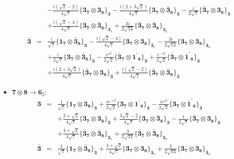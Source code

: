 \documentclass[english]{article}
\newcommand{\subcg}[3]{\big\{ {#1}\otimes{#2}\big\}^{}_{#3}}
\newcommand{\rep}[1]{\mathbf{#1}}
\begin{document}
\begin{itemize}
\begin{eqnarray*}
 & & -\frac{i \left(\sqrt{2}-2\right)}{4 \sqrt{7}}\subcg{\rep{3}_{\rep{7}}}{\rep{3}_{\rep{8}}}{\rep{3}}-\frac{i \left(2+3 \sqrt{2}\right)}{4 \sqrt{7}}\subcg{\rep{3}_{\rep{7}}}{\rep{\bar{3}}_{\rep{8}}}{\rep{3}}-\frac{i}{2 \sqrt{7}}\subcg{\rep{\bar{3}}_{\rep{7}}}{\rep{3}_{\rep{8}}}{\rep{3}} \\ 
 & & +\frac{i \left(\sqrt{2}-4\right)}{4 \sqrt{7}}\subcg{\rep{\bar{3}}_{\rep{7}}}{\rep{\bar{3}}_{\rep{8}}}{\rep{3}_{s}}+\frac{3 i}{2 \sqrt{14}}\subcg{\rep{\bar{3}}_{\rep{7}}}{\rep{\bar{3}}_{\rep{8}}}{\rep{3}_{a}}
\\
\rep{\bar{3}} &=& \frac{i}{\sqrt{7}}\subcg{\rep{1}_{\rep{7}}}{\rep{\bar{3}}_{\rep{8}}}{\rep{\bar{3}}}-\frac{i \left(\sqrt{2}-4\right)}{4 \sqrt{7}}\subcg{\rep{3}_{\rep{7}}}{\rep{3}_{\rep{8}}}{\rep{\bar{3}}_{s}}-\frac{3 i}{2 \sqrt{14}}\subcg{\rep{3}_{\rep{7}}}{\rep{3}_{\rep{8}}}{\rep{\bar{3}}_{a}} \\ 
 & & +\frac{i}{2 \sqrt{7}}\subcg{\rep{3}_{\rep{7}}}{\rep{\bar{3}}_{\rep{8}}}{\rep{\bar{3}}}-\frac{e^{i \beta }}{2 \sqrt{2}}\subcg{\rep{\bar{3}}_{\rep{7}}}{\rep{1^{\prime}}_{\rep{8}}}{\rep{\bar{3}}}+\frac{e^{-i \beta }}{2 \sqrt{2}}\subcg{\rep{\bar{3}}_{\rep{7}}}{\rep{\bar{1}^{\prime}}_{\rep{8}}}{\rep{\bar{3}}} \\ 
 & & +\frac{i \left(2+3 \sqrt{2}\right)}{4 \sqrt{7}}\subcg{\rep{\bar{3}}_{\rep{7}}}{\rep{3}_{\rep{8}}}{\rep{\bar{3}}}+\frac{i \left(\sqrt{2}-2\right)}{4 \sqrt{7}}\subcg{\rep{\bar{3}}_{\rep{7}}}{\rep{\bar{3}}_{\rep{8}}}{\rep{\bar{3}}}
\end{eqnarray*}
\item $\rep{7}\otimes\rep{8}\to\rep{6}_{2}$:
\begin{eqnarray*}
\rep{3} &=& \frac{1}{\sqrt{7}}\subcg{\rep{1}_{\rep{7}}}{\rep{3}_{\rep{8}}}{\rep{3}}+\frac{i e^{-i \beta }}{2 \sqrt{2}}\subcg{\rep{3}_{\rep{7}}}{\rep{1^{\prime}}_{\rep{8}}}{\rep{3}}-\frac{i e^{i \beta }}{2 \sqrt{2}}\subcg{\rep{3}_{\rep{7}}}{\rep{\bar{1}^{\prime}}_{\rep{8}}}{\rep{3}} \\ 
 & & +\frac{2+\sqrt{2}}{4 \sqrt{7}}\subcg{\rep{3}_{\rep{7}}}{\rep{3}_{\rep{8}}}{\rep{3}}+\frac{3 \sqrt{2}-2}{4 \sqrt{7}}\subcg{\rep{3}_{\rep{7}}}{\rep{\bar{3}}_{\rep{8}}}{\rep{3}}-\frac{1}{2 \sqrt{7}}\subcg{\rep{\bar{3}}_{\rep{7}}}{\rep{3}_{\rep{8}}}{\rep{3}} \\ 
 & & +\frac{4+\sqrt{2}}{4 \sqrt{7}}\subcg{\rep{\bar{3}}_{\rep{7}}}{\rep{\bar{3}}_{\rep{8}}}{\rep{3}_{s}}+\frac{3}{2 \sqrt{14}}\subcg{\rep{\bar{3}}_{\rep{7}}}{\rep{\bar{3}}_{\rep{8}}}{\rep{3}_{a}}
\\
\rep{\bar{3}} &=& \frac{1}{\sqrt{7}}\subcg{\rep{1}_{\rep{7}}}{\rep{\bar{3}}_{\rep{8}}}{\rep{\bar{3}}}+\frac{4+\sqrt{2}}{4 \sqrt{7}}\subcg{\rep{3}_{\rep{7}}}{\rep{3}_{\rep{8}}}{\rep{\bar{3}}_{s}}+\frac{3}{2 \sqrt{14}}\subcg{\rep{3}_{\rep{7}}}{\rep{3}_{\rep{8}}}{\rep{\bar{3}}_{a}} \\ 

\end{eqnarray*}
\end{itemize}
\end{document}

